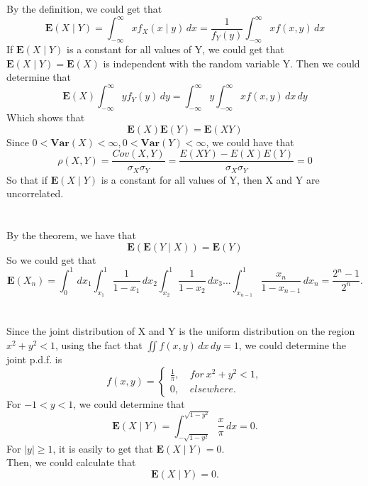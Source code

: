 \documentclass[10.5pt]{article}
\begin{document}
\section{}
By the definition, we could get that $$\mathbf{E}(X\mid Y)=\int_{-\infty}^{\infty}xf_X(x\mid y)\,dx=\frac{1}{f_Y(y)}\int_{-\infty}^{\infty}xf(x,y)\,dx$$\indent
If $\mathbf{E}(X\mid Y)$ is a constant for all values of Y, we could get that $\mathbf{E}(X\mid Y)=\mathbf{E}(X)$ is independent with the random variable Y. Then we could determine that $$\mathbf{E}(X)\int_{-\infty}^{\infty}yf_Y(y)\,dy=\int_{-\infty}^{\infty}y\int_{-\infty}^{\infty}xf(x,y)\,dx\,dy$$\indent
Which shows that $$\mathbf{E}(X)\mathbf{E}(Y)=\mathbf{E}(XY)$$\indent
Since $0<\mathbf{Var}(X)<\infty,0<\mathbf{Var}(Y)<\infty$, we could have that $$\rho(X,Y)=\frac{Cov(X,Y)}{\sigma_X\sigma_Y}=\frac{E(XY)-E(X)E(Y)}{\sigma_X\sigma_Y}=0$$\indent
So that if $\mathbf{E}(X\mid Y)$ is a constant for all values of Y, then X and Y are uncorrelated.

\section{}
By the theorem, we have that $$\mathbf{E}(\mathbf{E}(Y\mid X))=\mathbf{E}(Y)$$\indent
So we could get that $$\mathbf{E}(X_n)=\int_0^1\,dx_1\int_{x_1}^1\frac{1}{1-x_1}\,dx_2\int_{x_2}^1\frac{1}{1-x_2}\,dx_3\dots\int_{x_{n-1}}^1\frac{x_n}{1-x_{n-1}}\,dx_n=\frac{2^n-1}{2^n}.$$

\section{}
Since the joint distribution of X and Y is the uniform distribution on the region $x^2+y^2<1$, using the fact that $\iint f(x,y)\,dx\,dy=1$, we could determine the joint p.d.f. is $$f(x,y)= \begin{cases}
    \frac{1}{\pi},&~for~x^2+y^2<1,\\
    0,&~elsewhere.
\end{cases}$$\indent
For $-1<y<1$, we could determine that $$\mathbf{E}(X\mid Y)=\int_{-\sqrt{1-y^2}}^{\sqrt{1-y^2}}\frac{x}{\pi}\,dx=0.$$\indent
For $\left\lvert y\right\rvert \geqslant 1$, it is easily to get that $\mathbf{E}(X\mid Y)=0.$\\\indent
Then, we could calculate that $$\mathbf{E}(X\mid Y)=0.$$
\end{document}
